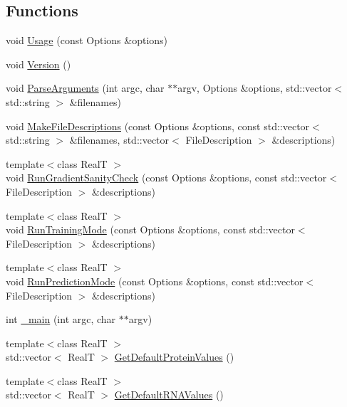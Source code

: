 \subsection*{Functions}
\begin{DoxyCompactItemize}
\item 
void \hyperlink{namespace_c_o_n_t_r_a_l_i_g_n_a66c65550f4f2eb3b394af028bd34ff9d}{Usage} (const Options \&options)
\item 
void \hyperlink{namespace_c_o_n_t_r_a_l_i_g_n_afe20ba6958ee01585cc59f5561ec7d17}{Version} ()
\item 
void \hyperlink{namespace_c_o_n_t_r_a_l_i_g_n_a2d13a8e4ad05e8d6e2eb17d2b0a5850d}{Parse\+Arguments} (int argc, char $\ast$$\ast$argv, Options \&options, std\+::vector$<$ std\+::string $>$ \&filenames)
\item 
void \hyperlink{namespace_c_o_n_t_r_a_l_i_g_n_a749642fa4b12d011d9c7d00e0ceb6f0c}{Make\+File\+Descriptions} (const Options \&options, const std\+::vector$<$ std\+::string $>$ \&filenames, std\+::vector$<$ File\+Description $>$ \&descriptions)
\item 
{\footnotesize template$<$class Real\+T $>$ }\\void \hyperlink{namespace_c_o_n_t_r_a_l_i_g_n_a3bb2b00a11ab75abcaa97365ed5b4e60}{Run\+Gradient\+Sanity\+Check} (const Options \&options, const std\+::vector$<$ File\+Description $>$ \&descriptions)
\item 
{\footnotesize template$<$class Real\+T $>$ }\\void \hyperlink{namespace_c_o_n_t_r_a_l_i_g_n_a4ac70c3821db72a2c91f310a3d9ed454}{Run\+Training\+Mode} (const Options \&options, const std\+::vector$<$ File\+Description $>$ \&descriptions)
\item 
{\footnotesize template$<$class Real\+T $>$ }\\void \hyperlink{namespace_c_o_n_t_r_a_l_i_g_n_adcd53b6a98750eadf9d1a2230d0cab18}{Run\+Prediction\+Mode} (const Options \&options, const std\+::vector$<$ File\+Description $>$ \&descriptions)
\item 
int \hyperlink{namespace_c_o_n_t_r_a_l_i_g_n_aafc1edb6cd98e5858af45afee8327797}{\+\_\+main} (int argc, char $\ast$$\ast$argv)
\item 
{\footnotesize template$<$class Real\+T $>$ }\\std\+::vector$<$ Real\+T $>$ \hyperlink{namespace_c_o_n_t_r_a_l_i_g_n_af16f9793f865b3059ac02c8127cccb62}{Get\+Default\+Protein\+Values} ()
\item 
{\footnotesize template$<$class Real\+T $>$ }\\std\+::vector$<$ Real\+T $>$ \hyperlink{namespace_c_o_n_t_r_a_l_i_g_n_af0f740c7a84dffe3866c40f17e13b5f8}{Get\+Default\+R\+N\+A\+Values} ()

\end{DoxyCompactItemize}

